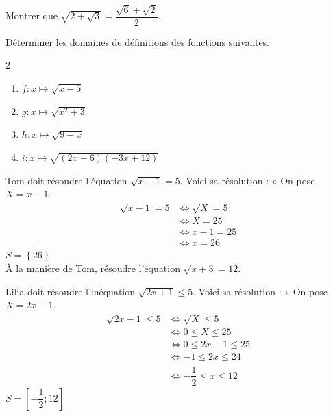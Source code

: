 {\begin{Exercice}
Montrer que $\sqrt{2 + \sqrt{3}} = \dfrac{\sqrt{6} + \sqrt{2}}{2}$.
\end{Exercice}

\begin{Exercice}
Déterminer les domaines de définitions des fonctions suivantes.
\vspace{-0.5cm}
\begin{multicols}{2}
\begin{enumerate}
    \item $f : x \mapsto \sqrt{x - 5}$
    \item $g : x \mapsto \sqrt{x^2 + 3}$
    \item $h : x \mapsto \sqrt{9 - x}$
    \item $i : x \mapsto \sqrt{(2x - 6)(-3x + 12)}$
\end{enumerate}
\end{multicols}
\end{Exercice}

\newpage

\begin{Exercice}
Tom doit résoudre l'équation $ \sqrt{x-1} = 5 $. Voici sa résolution :
« On pose $ X = x-1 $.
\begin{align*}
 \sqrt{x-1} = 5 &\Leftrightarrow \sqrt{X}=5 \\
 &\Leftrightarrow X=25\\
 &\Leftrightarrow x-1=25\\
 &\Leftrightarrow x=26
 \end{align*}
 $ S=\left\lbrace 26 \right\rbrace  $\\
 
À la manière de Tom, résoudre l'équation $ \sqrt{x+3} = 12 $.
\end{Exercice}

\begin{Exercice}
Lilia doit résoudre l'inéquation $ \sqrt{2x+1} \leq 5 $. Voici sa résolution :
« On pose $ X = 2x-1 $.
\begin{align*}
 \sqrt{2x-1} \leq 5 &\Leftrightarrow \sqrt{X} \leq 5 \\
 &\Leftrightarrow 0 \leq X \leq 25\\
 &\Leftrightarrow 0 \leq 2x+1 \leq 25\\
 &\Leftrightarrow -1 \leq 2x \leq 24\\
  &\Leftrightarrow -\dfrac{1}{2} \leq x \leq 12
 \end{align*}
 $ S=\left[ -\dfrac{1}{2}; 12\right]   $\\
 

\end{Exercice}}
